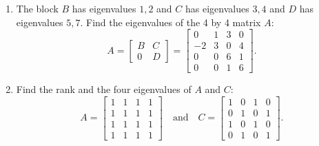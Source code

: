 \documentclass[14pt, a4paper]{article}
\begin{document}
\begin{enumerate}
    \item The block $B$ has eigenvalues $1, 2$ and $C$ has eigenvalues $3, 4$ and $D$ has eigenvalues $5, 7$. Find the eigenvalues of the 4 by 4 matrix $A$:
          \[
              A = \begin{bmatrix} B & C \\ 0 & D \end{bmatrix} = \begin{bmatrix} 0 & 1 & 3 & 0 \\ -2 & 3 & 0 & 4 \\ 0 & 0 & 6 & 1 \\ 0 & 0 & 1 & 6 \end{bmatrix} .
          \]

    \item Find the rank and the four eigenvalues of $A$ and $C$:
          \[
              A = \begin{bmatrix} 1 & 1 & 1 & 1 \\ 1 & 1 & 1 & 1 \\ 1 & 1 & 1 & 1 \\ 1 & 1 & 1 & 1 \end{bmatrix} \quad \text{and} \quad C = \begin{bmatrix} 1 & 0 & 1 & 0 \\ 0 & 1 & 0 & 1 \\ 1 & 0 & 1 & 0 \\ 0 & 1 & 0 & 1 \end{bmatrix} .
          \]
\end{enumerate}
\end{document}
